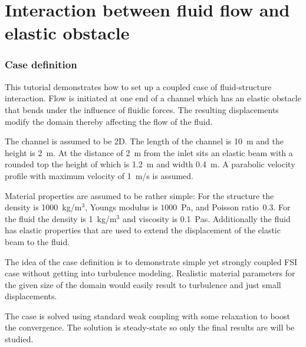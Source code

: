 \chapter{Interaction between fluid flow and elastic obstacle}



\subsection*{Case definition}
 

This tutorial demonstrates how to set up a coupled case
of fluid-structure interaction. Flow is 
initiated at one end of a channel which has an elastic obstacle
that bends under the influence of fluidic forces. The resulting displacements 
modify the domain thereby affecting the flow of the fluid.



The channel is assumed to be 2D. The length of the channel is 10~m and the height 
is 2~m. At the distance of 2~m from the inlet sits an elastic beam with a rounded top the height of which is
1.2~m and width 0.4~m. A parabolic velocity profile with maximum velocity
of 1~m/s is assumed.  

Material properties are assumed to be rather simple:
For the structure the density is 
1000~kg/m$^3$, Youngs modulus is $1000$~Pa, and Poisson ratio~0.3. For the 
fluid the density is 1~kg/m$^3$ and viscosity is 0.1~Pas. Additionally the 
fluid has elastic properties that are used to extend the displacement 
of the elastic beam to the fluid. 

The idea of the case definition is to 
demonstrate simple yet strongly coupled FSI case without getting into turbulence modeling. Realistic 
material parameters for the given size of the domain would easily result to turbulence and just small 
displacements.

The case is solved using standard weak coupling with some relaxation to
boost the convergence. The solution is steady-state so 
only the final results are will be studied. 




